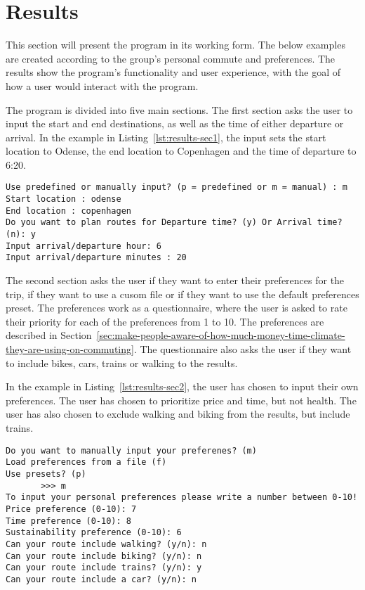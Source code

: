 \section{Results}\label{sec:results}

This section will present the program in its working form.
The below examples are created according to the group's personal commute and preferences.
The results show the program's functionality and user experience, with the goal of how a user would interact with the
program.

The program is divided into five main sections.
The first section asks the user to input the start and end destinations, as well as the time of either departure or
arrival.
In the example in Listing~\ref{lst:results-sec1}, the input sets the start location to Odense, the end location to
Copenhagen and the time of departure to 6:20.

\begin{lstlisting}[label={lst:results-sec1}, caption={Basic parameters input.}, captionpos=b, language={}]
Use predefined or manually input? (p = predefined or m = manual) : m
Start location : odense
End location : copenhagen
Do you want to plan routes for Departure time? (y) Or Arrival time? (n): y
Input arrival/departure hour: 6
Input arrival/departure minutes : 20
\end{lstlisting}

The second section asks the user if they want to enter their preferences for the trip, if they want to use a cusom
file or if they want to use the default preferences preset.
The preferences work as a questionnaire, where the user is asked to rate their priority for each of the preferences from
1 to 10.
The preferences are described in Section~\ref{sec:make-people-aware-of-how-much-money-time-climate-they-are-using-on-commuting}.
The questionnaire also asks the user if they want to include bikes, cars, trains or walking to the results.

In the example in Listing~\ref{lst:results-sec2}, the user has chosen to input their own preferences.
The user has chosen to prioritize price and time, but not health.
The user has also chosen to exclude walking and biking from the results, but include trains.

\begin{lstlisting}[label={lst:results-sec2}, caption={Custom preferences input.}, captionpos=b, language={}]
Do you want to manually input your preferenes? (m)
Load preferences from a file (f)
Use presets? (p)
       >>> m
To input your personal preferences please write a number between 0-10!
Price preference (0-10): 7
Time preference (0-10): 8
Sustainability preference (0-10): 6
Can your route include walking? (y/n): n
Can your route include biking? (y/n): n
Can your route include trains? (y/n): y
Can your route include a car? (y/n): n
\end{lstlisting}

